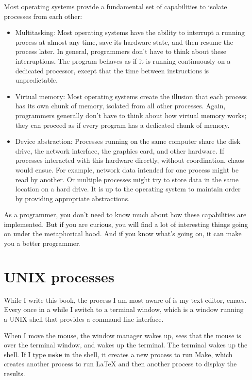 \documentclass[12pt]{book}
\begin{document}
{Most operating systems provide a fundamental set of capabilities
to isolate processes from each other:

\begin{itemize}

\item Multitasking: Most operating systems have the ability to
  interrupt a running process at almost any time, save its hardware
  state, and then resume the process later.  In general, programmers
  don't have to think about these interruptions.  The program behaves
  as if it is running continuously on a dedicated processor, 
  except that the time between instructions is unpredictable.

\item Virtual memory: Most operating systems create the
  illusion that each process has its own chunk of memory, isolated
  from all other processes.  Again, programmers generally don't
  have to think about how virtual memory works; they can proceed
  as if every program has a dedicated chunk of memory.

\item Device abstraction: Processes running on the same computer share
  the disk drive, the network interface, the graphics card, and other
  hardware.  If processes interacted with this hardware directly,
  without coordination, chaos would ensue.  For example, network data
  intended for one process might be read by another.  Or multiple
  processes might try to store data in the same location on a hard
  drive.  It is up to the operating system to maintain order by
  providing appropriate abstractions.

\end{itemize}

As a programmer, you don't need to know much about how these
capabilities are implemented.  But if you are
curious, you will find a lot of interesting things
going on under the metaphorical hood.  And if you know what's
going on, it can make you a better programmer.


\section{UNIX processes}
\label{unixps}

While I write this book, the process I
am most aware of is my text editor, emacs.  Every once in a while
I switch to a terminal window, which is a window running a UNIX shell
that provides a command-line interface.

When I move the mouse, the window manager wakes up, sees that the
mouse is over the terminal window, and wakes up the terminal.
The terminal wakes up the shell.
If I type {\tt make} in the shell, it creates a
new process to run Make, which creates another process to run LaTeX
and then another process to display the results.

}
\end{document}
